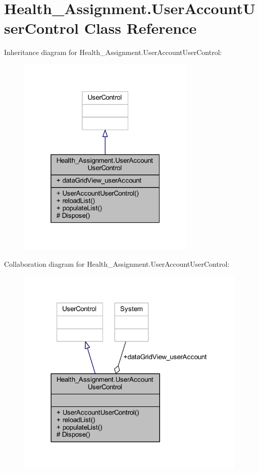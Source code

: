 \hypertarget{class_health___assignment_1_1_user_account_user_control}{}\section{Health\+\_\+\+Assignment.\+User\+Account\+User\+Control Class Reference}
\label{class_health___assignment_1_1_user_account_user_control}


Inheritance diagram for Health\+\_\+\+Assignment.\+User\+Account\+User\+Control\+:\nopagebreak
\begin{figure}[H]
\begin{center}
\leavevmode
\includegraphics[width=241pt]{class_health___assignment_1_1_user_account_user_control__inherit__graph}
\end{center}
\end{figure}


Collaboration diagram for Health\+\_\+\+Assignment.\+User\+Account\+User\+Control\+:\nopagebreak
\begin{figure}[H]
\begin{center}
\leavevmode
\includegraphics[width=312pt]{class_health___assignment_1_1_user_account_user_control__coll__graph}
\end{center}
\end{figure}
